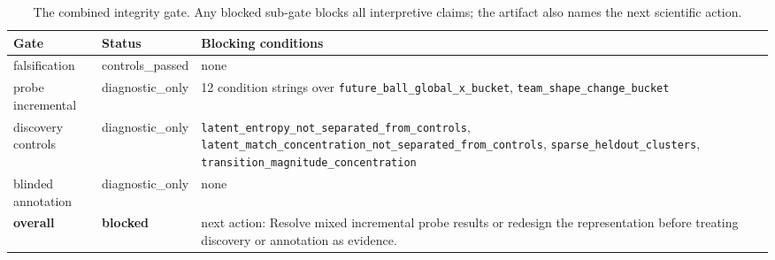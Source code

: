 \begin{table}[t]
  \centering
  \small
  \begin{tabular}{llp{7.4cm}}
    \toprule
    Gate & Status & Blocking conditions \\
    \midrule
    falsification & controls\_passed & none \\
    probe incremental & diagnostic\_only & 12 condition strings over \texttt{future\_ball\_global\_x\_bucket}, \texttt{team\_shape\_change\_bucket} \\
    discovery controls & diagnostic\_only & \texttt{latent\_entropy\_not\_separated\_from\_controls}, \texttt{latent\_match\_concentration\_not\_separated\_from\_controls}, \texttt{sparse\_heldout\_clusters}, \texttt{transition\_magnitude\_concentration} \\
    blinded annotation & diagnostic\_only & none \\
    \midrule
    \textbf{overall} & \textbf{blocked} & next action: Resolve mixed incremental probe results or redesign the representation before treating discovery or annotation as evidence. \\
    \bottomrule
  \end{tabular}
  \caption{The combined integrity gate. Any blocked sub-gate blocks all interpretive claims; the artifact also names the next scientific action.}
  \label{tab:gate}
\end{table}
